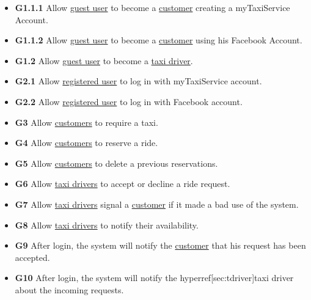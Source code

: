 \documentclass{report}
\begin{document}
		\begin{itemize}
			\item \textbf{\lbrack G1.1.1\rbrack}\label{sec:g1_1_1} Allow \hyperref[sec:normaluser]{guest user} to become a \hyperref[sec:customer]{customer} creating a myTaxiService Account.

			\item \textbf{\lbrack G1.1.2\rbrack}\label{sec:g1_1_2} Allow \hyperref[sec:normaluser]{guest user} to become a \hyperref[sec:customer]{customer} using his Facebook Account.

			\item \textbf{\lbrack G1.2\rbrack}\label{sec:g1_2} Allow \hyperref[sec:normaluser]{guest user} to become a \hyperref[sec:tdriver]{taxi driver}.

			\item \textbf{\lbrack G2.1\rbrack}\label{sec:g2_1}  Allow \hyperref[sec:ruser]{registered user} to log in with myTaxiService account.

			\item \textbf{\lbrack G2.2\rbrack}\label{sec:g2_2}  Allow \hyperref[sec:ruser]{registered user} to log in with Facebook account.

			\item \textbf{\lbrack G3\rbrack}\label{sec:g3}  Allow \hyperref[sec:customer]{customers} to require a taxi.

			\item \textbf{\lbrack G4\rbrack}\label{sec:g4}  Allow \hyperref[sec:customer]{customers} to reserve a ride.

			\item \textbf{\lbrack G5\rbrack}\label{sec:g5}  Allow \hyperref[sec:customer]{customers} to delete a previous reservations.

			\item \textbf{\lbrack G6\rbrack}\label{sec:g6}  Allow \hyperref[sec:tdriver]{taxi drivers} to accept or decline a ride request.

			\item \textbf{\lbrack G7\rbrack}\label{sec:g7} Allow \hyperref[sec:tdriver]{taxi drivers} signal a \hyperref[sec:customer]{customer} if it made a bad use of the system.

			\item \textbf{\lbrack G8\rbrack}\label{sec:g8}  Allow \hyperref[sec:tdriver]{taxi drivers} to notify their availability.

			\item \textbf{\lbrack G9\rbrack}\label{sec:g9}  After login, the system will notify the \hyperref[sec:customer]{customer} that his request has been accepted.

			\item \textbf{\lbrack G10\rbrack}\label{sec:g10}  After login, the system will notify the hyperref[sec:tdriver]{taxi driver} about the incoming requests.
		\end{itemize}
		
\end{document}

